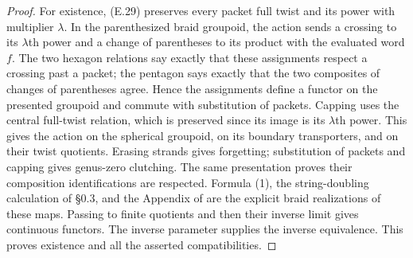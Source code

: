 \begin{proof}
For existence, (E.29) preserves every packet full twist and its
power with multiplier $\lambda$.  In the parenthesized braid
groupoid, the action sends a crossing to its $\lambda$th power
and a change of parentheses to its product with the evaluated
word $f$.  The two hexagon relations say exactly that these
assignments respect a crossing past a packet; the pentagon
says exactly that the two composites of changes of parentheses
agree.  Hence the assignments define a functor on the presented
groupoid and commute with substitution of packets.  Capping
uses the central full-twist relation, which is preserved since
its image is its $\lambda$th power.  This gives the action on
the spherical groupoid, on its boundary transporters, and on
their twist quotients.  Erasing strands gives forgetting;
substitution of packets and capping gives genus-zero clutching.
The same presentation proves their composition identifications
are respected.  Formula (1), the string-doubling calculation of
\S0.3, and the Appendix of \cite{ET_HS2000} are the explicit
braid realizations of these maps.  Passing to finite quotients
and then their inverse limit gives continuous functors.  The
inverse parameter supplies the inverse equivalence.  This
proves existence and all the asserted compatibilities.
\end{proof}

